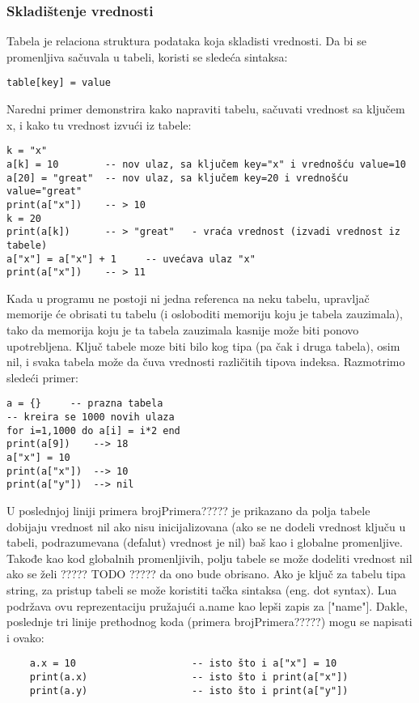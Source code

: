 \documentclass[a4paper]{article}
\begin{document}
\subsubsection{Skladištenje vrednosti}
Tabela je relaciona struktura podataka koja skladisti vrednosti. Da bi se promenljiva sačuvala u tabeli, koristi se sledeća sintaksa:
\begin{verbatim}
table[key] = value
\end{verbatim}
Naredni primer demonstrira kako napraviti tabelu, sačuvati vrednost sa ključem x, i kako tu vrednost izvući iz tabele:
\begin{verbatim}
k = "x"
a[k] = 10        -- nov ulaz, sa ključem key="x" i vrednošću value=10
a[20] = "great"  -- nov ulaz, sa ključem key=20 i vrednošću value="great"
print(a["x"])    -- > 10
k = 20
print(a[k])      -- > "great"	- vraća vrednost (izvadi vrednost iz tabele)
a["x"] = a["x"] + 1     -- uvećava ulaz "x"
print(a["x"])    -- > 11
\end{verbatim}
Kada u programu ne postoji ni jedna referenca na neku tabelu, upravljač memorije će obrisati tu tabelu (i osloboditi memoriju koju je tabela zauzimala), tako da memorija koju je ta tabela zauzimala kasnije može biti ponovo upotrebljena.
Ključ tabele moze biti bilo kog tipa (pa čak i druga tabela), osim nil, i svaka tabela može da čuva vrednosti različitih tipova indeksa. Razmotrimo sledeći primer:
\begin{verbatim}
a = {}     -- prazna tabela
-- kreira se 1000 novih ulaza
for i=1,1000 do a[i] = i*2 end
print(a[9])    --> 18
a["x"] = 10
print(a["x"])  --> 10
print(a["y"])  --> nil
\end{verbatim}
U poslednjoj liniji primera brojPrimera????? je prikazano da polja tabele dobijaju vrednost nil ako nisu inicijalizovana (ako se ne dodeli vrednost ključu u tabeli, podrazumevana (defalut) vrednost je nil) baš kao i globalne promenljive. Takođe kao kod globalnih promenljivih, polju tabele se može dodeliti vrednost nil ako se želi ????? TODO ????? da ono bude obrisano.
Ako je ključ za tabelu tipa string, za pristup tabeli se može koristiti tačka sintaksa (eng. dot syntax). Lua podržava ovu reprezentaciju pružajući a.name kao lepši zapis za ["name"]. Dakle, poslednje tri linije prethodnog koda (primera brojPrimera?????) mogu se napisati i ovako:
\begin{verbatim}
    a.x = 10                    -- isto što i a["x"] = 10
    print(a.x)                  -- isto što i print(a["x"])
    print(a.y)                  -- isto što i print(a["y"])
\end{verbatim}
\end{document}
